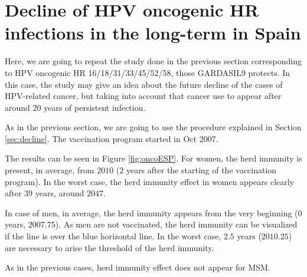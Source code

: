 \section{Decline of HPV oncogenic HR infections in the long-term in Spain}
Here, we are going to repeat the study done in the previous section corresponding to HPV oncogenic HR 16/18/31/33/45/52/58, those GARDASIL9 protects. In this case, the study may give an idea about the future decline of the cases of HPV-related cancer, but taking into account that cancer use to appear after around $20$ years of persistent infection. 

As in the previous section, we are going to use the procedure explained in Section \ref{sec:decline}. The vaccination program started in Oct 2007.

The results can be seen in Figure \ref{fig:oncoESP}. For women, the herd immunity is present, in average, from $2010$ ($2$ years after the starting of the vaccination program). In the worst case, the herd immunity effect in women appears clearly after $39$ years, around $2047$.

In case of men, in average, the herd immunity appears from the very beginning ($0$ years, $2007.75$). As men are not vaccinated, the herd immunity can be visualized if the line is over the blue horizontal line. In the worst case, $2.5$ years ($2010.25$) are necessary to arise the threshold of the herd immunity.  

As in the previous cases, herd immunity effect does not appear for MSM.

